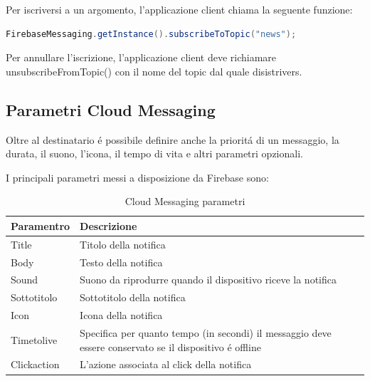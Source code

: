 Per iscriversi a un argomento, l'applicazione client chiama la seguente funzione:

\begin{lstlisting}[language=java,caption={FCM topic}]
 FirebaseMessaging.getInstance().subscribeToTopic("news");
\end{lstlisting}

Per annullare l'iscrizione, l'applicazione client deve richiamare unsubscribeFromTopic() con il nome del topic dal quale disistrivers.





\subsection{Parametri Cloud Messaging}

Oltre al destinatario \'e possibile definire anche la priorit\'a di un messaggio, la durata, il suono, l'icona, il tempo di vita e altri parametri opzionali.

I principali parametri messi a disposizione da Firebase sono:

\begin{table}[h]
\begin{center}
\begin{tabular}{|p{3cm}|p{11cm}|}
\hline
\textbf{Paramentro} & \textbf{Descrizione} \\ \hline
Title &	Titolo della notifica \\   \hline
Body &	Testo della notifica \\   \hline
Sound  &	Suono da riprodurre quando il dispositivo riceve la notifica \\   \hline
Sottotitolo  &	Sottotitolo della notifica \\   \hline
Icon & Icona della notifica \\   \hline
Timetolive & Specifica per quanto tempo (in secondi) il messaggio deve essere conservato se il dispositivo \'e offline  \\   \hline
Clickaction & L'azione associata al click della notifica \\   \hline

\end{tabular}
\caption[Cloud Messaging paramentri]{Cloud Messaging parametri}\label{tab:Cloud Messaging parametri}
\end{center}
\end{table}



